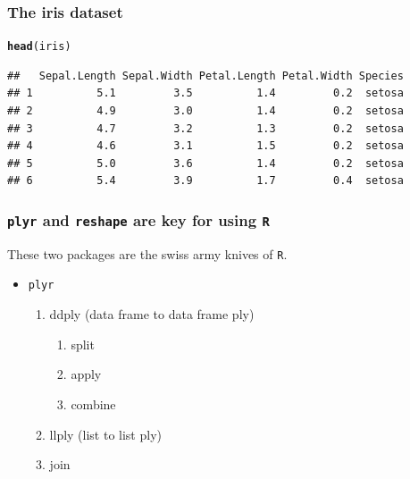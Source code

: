 \documentclass{beamer}\usepackage[]{graphicx}\usepackage[]{color}
\makeatletter
\newcommand{\hlstd}[1]{\textcolor[rgb]{0.345,0.345,0.345}{#1}}%
\newcommand{\hlkwd}[1]{\textcolor[rgb]{0.737,0.353,0.396}{\textbf{#1}}}%
\newenvironment{kframe}{%
 \def\at@end@of@kframe{}%
 \ifinner\ifhmode%
  \def\at@end@of@kframe{\end{minipage}}%
  \begin{minipage}{\columnwidth}%
 \fi\fi%
 \def\FrameCommand##1{\hskip\@totalleftmargin \hskip-\fboxsep
 \colorbox{shadecolor}{##1}\hskip-\fboxsep
     \hskip-\linewidth \hskip-\@totalleftmargin \hskip\columnwidth}%
 \MakeFramed {\advance\hsize-\width
   \@totalleftmargin\z@ \linewidth\hsize
   \@setminipage}}%
 {\par\unskip\endMakeFramed%
 \at@end@of@kframe}
\newenvironment{knitrout}{}{} %
\makeatother
\begin{document}

\begin{frame}[fragile]
\frametitle{The iris dataset}
\begin{knitrout}\footnotesize
{}\color{fgcolor}\begin{kframe}
\begin{alltt}
\hlkwd{head}\hlstd{(iris)}
\end{alltt}
\begin{verbatim}
##   Sepal.Length Sepal.Width Petal.Length Petal.Width Species
## 1          5.1         3.5          1.4         0.2  setosa
## 2          4.9         3.0          1.4         0.2  setosa
## 3          4.7         3.2          1.3         0.2  setosa
## 4          4.6         3.1          1.5         0.2  setosa
## 5          5.0         3.6          1.4         0.2  setosa
## 6          5.4         3.9          1.7         0.4  setosa
\end{verbatim}
\end{kframe}
\end{knitrout}

\end{frame}


\begin{frame}[fragile]
\frametitle{\texttt{plyr} and \texttt{reshape} are key for using \texttt{R}}
These two packages are the swiss army knives of \texttt{R}.
\begin{itemize}
\item \texttt{plyr}
    \begin{enumerate}
    \item ddply (data frame to data frame ply)
        \begin{enumerate}
        \item split
        \item apply
        \item combine
        \end{enumerate}
    \item llply (list to list ply)
    \item join
    \end{enumerate}
\end{itemize}
\end{frame}

\end{document}
